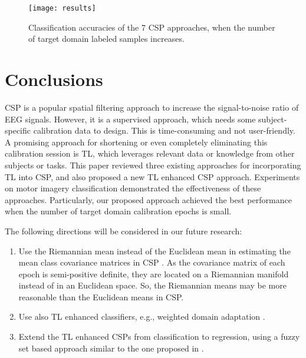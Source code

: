 \documentclass[runningheads]{llncs}
\begin{document}
\begin{figure}\centering
\texttt{[image: results]}
\caption{Classification accuracies of the 7 CSP approaches, when the number of target domain labeled samples increases.} \label{fig:1}
\end{figure}

\section{Conclusions} \label{sect:conclusions}

CSP is a popular spatial filtering approach to increase the signal-to-noise ratio of EEG signals. However, it is a supervised approach, which needs some subject-specific calibration data to design. This is time-consuming and not user-friendly. A promising approach for shortening or even completely eliminating this calibration session is TL, which leverages relevant data or knowledge from other subjects or tasks. This paper reviewed three existing approaches for incorporating TL into CSP, and also proposed a new TL enhanced CSP approach. Experiments on motor imagery classification demonstrated the effectiveness of these approaches. Particularly, our proposed approach achieved the best performance when the number of target domain calibration epochs is small.

The following directions will be considered in our future research:
\begin{enumerate}
\item Use the Riemannian mean instead of the Euclidean mean in estimating the mean class covariance matrices in CSP \cite{Barachant2010}. As the covariance matrix of each epoch is semi-positive definite, they are located on a Riemannian manifold instead of in an Euclidean space. So, the Riemannian means may be more reasonable than the Euclidean means in CSP.
\item Use also TL enhanced classifiers, e.g., weighted domain adaptation \cite{drwuTHMS2017,drwuTNSRE2016}.
\item Extend the TL enhanced CSPs from classification to regression, using a fuzzy set based approach similar to the one proposed in \cite{drwuSF2018}.
\end{enumerate}
\end{document}
